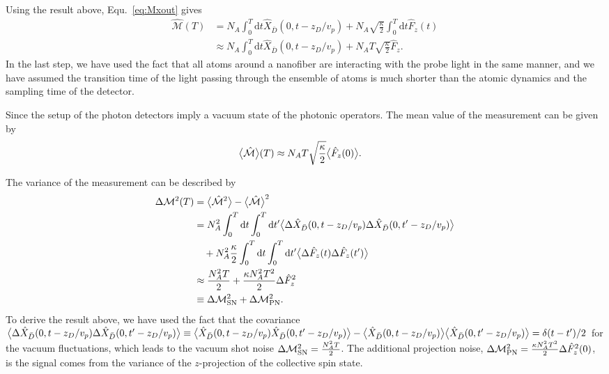 Using the result above, Equ.~\ref{eq:Mxout} gives
\begin{align}
\hat{\mathcal{M}}(T) &= N_A\int_0^T\mathrm{d}t \hat{X}_{\bar{D}}(0,t-z_D/v_p) + N_A \sqrt{\frac{\kappa}{2}}\int_0^T\mathrm{d}t\hat{F}_z(t)\\
&\approx N_A\int_0^T\mathrm{d}t \hat{X}_{\bar{D}}(0,t-z_D/v_p) + N_AT\sqrt{\frac{\kappa}{2}}\hat{F}_z.
\end{align}
In the last step, we have used the fact that all atoms around a nanofiber are interacting with the probe light in the same manner, and we have assumed the transition time of the light passing through the ensemble of atoms is much shorter than the atomic dynamics and the sampling time of the detector. 

Since the setup of the photon detectors imply a vacuum state of the photonic operators. The mean value of the measurement can be given by 
\begin{align}
\big\langle \hat{\mathcal{M}} \big\rangle(T) &\approx N_AT\sqrt{\frac{\kappa}{2}}\big\langle \hat{F}_z(0) \big\rangle.
\end{align}

The variance of the measurement can be described by
\begin{align}
\Delta \mathcal{M}^2(T) &= \big\langle \hat{\mathcal{M}}^2 \big\rangle-\big\langle \hat{\mathcal{M}} \big\rangle^2\\
&= N_A^2 \int_0^T\mathrm{d}t \int_0^T\mathrm{d}t'  \big\langle \Delta\hat{X}_{\bar{D}}(0,t-z_D/v_p)\Delta\hat{X}_{\bar{D}}(0,t'-z_D/v_p) \big\rangle \nonumber\\
&\quad + N_A^2 \frac{\kappa}{2} \int_0^T\mathrm{d}t \int_0^T\mathrm{d}t'\big\langle \Delta\hat{F}_z(t)\Delta\hat{F}_z(t') \big\rangle\\
&\approx \frac{N_A^2T}{2} + \frac{\kappa N_A^2T^2}{2} \Delta\hat{F}_z^2\\
&\equiv \Delta \mathcal{M}_{\rm SN}^2 + \Delta\mathcal{M}_{\rm PN}^2.
\end{align}
To derive the result above, we have used the fact that the covariance $ \big\langle \Delta\hat{X}_{\bar{D}}(0,t-z_D/v_p)\Delta\hat{X}_{\bar{D}}(0,t'-z_D/v_p) \big\rangle\equiv \big\langle \hat{X}_{\bar{D}}(0,t-z_D/v_p)\hat{X}_{\bar{D}}(0,t'-z_D/v_p) \big\rangle-\big\langle \hat{X}_{\bar{D}}(0,t-z_D/v_p) \big\rangle\big\langle \hat{X}_{\bar{D}}(0,t'-z_D/v_p) \big\rangle=\delta(t-t')/2 $ for the vacuum fluctuations, which leads to the vacuum shot noise $ \Delta \mathcal{M}_{\rm SN}^2=\frac{N_A^2T}{2} $. The additional projection noise, $ \Delta\mathcal{M}_{\rm PN}^2=\frac{\kappa N_A^2T^2}{2} \Delta\hat{F}_z^2(0) $, is the signal comes from the variance of the $ z $-projection of the collective spin state.  

